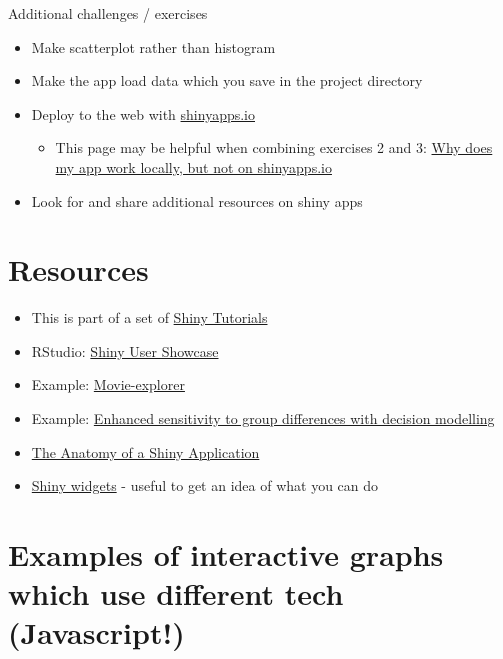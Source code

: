 \documentclass[
]{book}
\providecommand{\tightlist}{%
  \setlength{\itemsep}{0pt}\setlength{\parskip}{0pt}}
\begin{document}
Additional challenges / exercises

\begin{itemize}
\tightlist
\item
  Make scatterplot rather than histogram
\item
  Make the app load data which you save in the project directory
\item
  Deploy to the web with \href{https://www.shinyapps.io/}{shinyapps.io}

  \begin{itemize}
  \tightlist
  \item
    This page may be helpful when combining exercises 2 and 3: \href{https://support.rstudio.com/hc/en-us/articles/229848967-Why-does-my-app-work-locally-but-not-on-shinyapps-io-}{Why does my app work locally, but not on shinyapps.io}
  \end{itemize}
\item
  Look for and share additional resources on shiny apps
\end{itemize}

\hypertarget{resources-10}{%
\section{Resources}\label{resources-10}}

\begin{itemize}
\tightlist
\item
  This is part of a set of \href{https://psyteachr.github.io/shiny-tutorials/index.html}{Shiny Tutorials}
\item
  RStudio: \href{https://shiny.rstudio.com/gallery/}{Shiny User Showcase}
\item
  Example: \href{https://shiny.rstudio.com/gallery/movie-explorer.html}{Movie-explorer}
\item
  Example: \href{https://sheffield-university.shinyapps.io/decision_power/}{Enhanced sensitivity to group differences with decision modelling}
\item
  \href{https://www.r-bloggers.com/2021/04/the-anatomy-of-a-shiny-application/}{The Anatomy of a Shiny Application}
\item
  \href{https://shiny.rstudio.com/tutorial/written-tutorial/lesson3/}{Shiny widgets} - useful to get an idea of what you can do
\end{itemize}

\hypertarget{examples-of-interactive-graphs-which-use-different-tech-javascript}{%
\section{Examples of interactive graphs which use different tech (Javascript!)}\label{examples-of-interactive-graphs-which-use-different-tech-javascript}}
\end{document}
